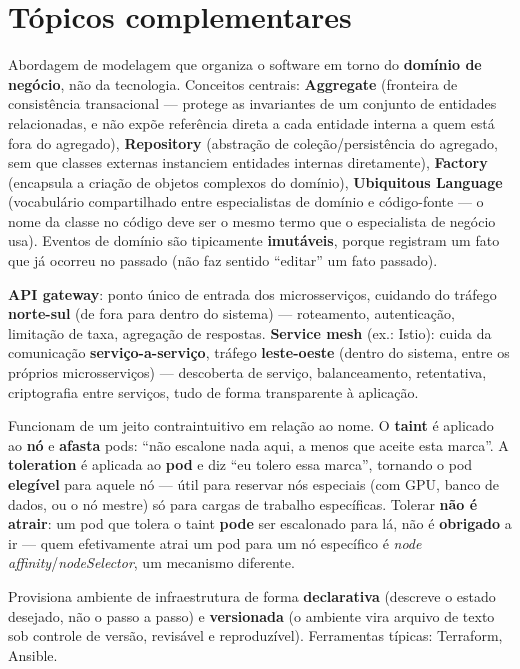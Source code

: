 \section{Tópicos complementares}

\begin{conceito}
Abordagem de modelagem que organiza o software em torno do
\textbf{domínio de negócio}, não da tecnologia. Conceitos centrais:
\textbf{Aggregate} (fronteira de consistência transacional --- protege as
invariantes de um conjunto de entidades relacionadas, e não expõe
referência direta a cada entidade interna a quem está fora do agregado),
\textbf{Repository} (abstração de coleção/persistência do agregado, sem
que classes externas instanciem entidades internas diretamente),
\textbf{Factory} (encapsula a criação de objetos complexos do domínio),
\textbf{Ubiquitous Language} (vocabulário compartilhado entre
especialistas de domínio e código-fonte --- o nome da classe no código
deve ser o mesmo termo que o especialista de negócio usa). Eventos de
domínio são tipicamente \textbf{imutáveis}, porque registram um fato que
já ocorreu no passado (não faz sentido “editar” um fato passado).
\end{conceito}

\begin{conceito}
\textbf{API gateway}: ponto único de entrada dos microsserviços,
cuidando do tráfego \textbf{norte-sul} (de fora para dentro do sistema) ---
roteamento, autenticação, limitação de taxa, agregação de respostas.
\textbf{Service mesh} (ex.: Istio): cuida da comunicação
\textbf{serviço-a-serviço}, tráfego \textbf{leste-oeste} (dentro do
sistema, entre os próprios microsserviços) --- descoberta de serviço,
balanceamento, retentativa, criptografia entre serviços, tudo de forma
transparente à aplicação.
\end{conceito}

\begin{conceito}
Funcionam de um jeito contraintuitivo em relação ao nome. O
\textbf{taint} é aplicado ao \textbf{nó} e \textbf{afasta} pods: “não
escalone nada aqui, a menos que aceite esta marca”. A \textbf{toleration}
é aplicada ao \textbf{pod} e diz “eu tolero essa marca”, tornando o pod
\textbf{elegível} para aquele nó --- útil para reservar nós especiais
(com GPU, banco de dados, ou o nó mestre) só para cargas de trabalho
específicas. Tolerar \textbf{não é atrair}: um pod que tolera o taint
\textbf{pode} ser escalonado para lá, não é \textbf{obrigado} a ir --- quem
efetivamente atrai um pod para um nó específico é \textit{node
affinity}/\textit{nodeSelector}, um mecanismo diferente.
\end{conceito}

\begin{conceito}
Provisiona ambiente de infraestrutura de forma \textbf{declarativa}
(descreve o estado desejado, não o passo a passo) e \textbf{versionada}
(o ambiente vira arquivo de texto sob controle de versão, revisável e
reproduzível). Ferramentas típicas: Terraform, Ansible.
\end{conceito}
